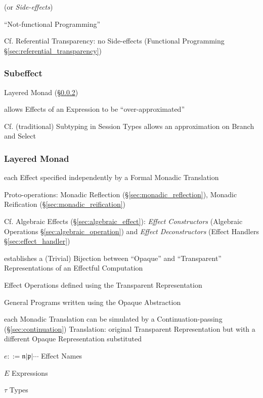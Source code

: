 (or \emph{Side-effects})

``Not-functional Programming''

\fist Cf. Referential Transparency: no Side-effects (Functional
Programming \S\ref{sec:referential_transparency})



\subsubsection{Subeffect}\label{sec:subeffect}

Layered Monad (\S\ref{sec:layered_monad}) \cite{filinski99}

allows Effects of an Expression to be ``over-approximated''
\cite{orchard-yoshida16}

\fist Cf. (traditional) Subtyping in Session Types allows an
approximation on Branch and Select \cite{orchard-yoshida16}



\subsubsection{Layered Monad}\label{sec:layered_monad}
\cite{filinski99}

each Effect specified independently by a Formal Monadic Translation

Proto-operations: Monadic Reflection (\S\ref{sec:monadic_reflection}),
Monadic Reification (\S\ref{sec:monadic_reification})

\fist Cf. Algebraic Effects (\S\ref{sec:algebraic_effect}):
\emph{Effect Constructors} (Algebraic Operations
\S\ref{sec:algebraic_operation}) and \emph{Effect Deconstructors}
(Effect Handlers \S\ref{sec:effect_handler})


establishes a (Trivial) Bijection between ``Opaque'' and
``Transparent'' Representations of an Effectful Computation

Effect Operations defined using the Transparent Representation

General Programs written using the Opaque Abstraction

each Monadic Translation can be simulated by a Continuation-passing
(\S\ref{sec:continuation}) Translation: original Transparent
Representation but with a different Opaque Representation substituted

$e ::= \mathfrak{n} | \mathfrak{p} | \cdots$ Effect Names

$E$ Expressions

$\tau$ Types

